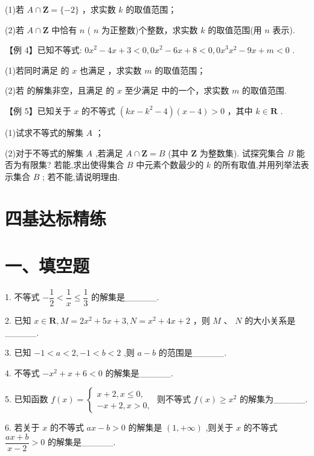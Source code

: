 (1)若 $A \cap  \mathbf{Z} = \{  - 2\}$ ，求实数 $k$ 的取值范围；

(2)若 $A \cap  \mathbf{Z}$ 中恰有 $n$ ( $n$ 为正整数)个整数，求实数 $k$ 的取值范围(用 $n$ 表示).

【例 4】已知不等式: ${0x}^{2} - {4x} + 3 < 0,{0x}^{2} - {6x} + 8 < 0,{0x}^{3}{x}^{2} - {9x} + m < 0$ .

(1)若同时满足    的 $x$ 也满足  ，求实数 $m$ 的取值范围；

(2)若  的解集非空，且满足    的 $x$ 至少满足      中的一个，求实数 $m$ 的取值范围.

【例 5】已知关于 $x$ 的不等式 $\left( {{kx} - {k}^{2} - 4}\right) \left( {x - 4}\right)  > 0$ ，其中 $k \in  \mathbf{R}$ .

(1)试求不等式的解集 $A$ ；

(2)对于不等式的解集 $A$ ,若满足 $A \cap  \mathbf{Z} = B$ (其中 $\mathbf{Z}$ 为整数集). 试探究集合 $B$ 能否为有限集? 若能,求出使得集合 $B$ 中元素个数最少的 $k$ 的所有取值,并用列举法表示集合 $B$ ; 若不能,请说明理由.

\section*{四基达标精练}

\section*{一、填空题}

1. 不等式 $- \dfrac{1}{2} < \dfrac{1}{x} \leq  \dfrac{1}{3}$ 的解集是\_\_\_\_\_.

2. 已知 $x \in  \mathbf{R},M = 2{x}^{2} + {5x} + 3,N = {x}^{2} + {4x} + 2$ ，则 $M$ 、 $N$ 的大小关系是\_\_\_\_\_.

3. 已知 $- 1 < a < 2, - 1 < b < 2$ ,则 $a - b$ 的范围是\_\_\_\_\_.

4. 不等式 $- {x}^{2} + x + 6 < 0$ 的解集是\_\_\_\_\_.

5. 已知函数 $f\left( x\right)  = \left\{  \begin{array}{l} x + 2,x \leq  0, \\   - x + 2,x > 0, \end{array}\right.$ 则不等式 $f\left( x\right)  \geq  {x}^{2}$ 的解集为\_\_\_\_\_.

6. 若关于 $x$ 的不等式 ${ax} - b > 0$ 的解集是 $\left( {1, + \infty }\right)$ ,则关于 $x$ 的不等式 $\dfrac{{ax} + b}{x - 2} > 0$ 的解集是\_\_\_\_\_.

